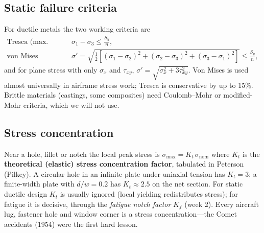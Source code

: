 \documentclass[11pt,a4paper]{article}
\begin{document}
\begin{center}
\end{center}

\subsection{Static failure criteria}

For ductile metals the two working criteria are
\begin{align}
  \text{Tresca (max.\ shear):}\quad & \sigma_1-\sigma_3 \le \frac{S_y}{n},\\
  \text{von Mises (distortion energy):}\quad & \sigma' = \sqrt{\tfrac12\left[(\sigma_1-\sigma_2)^2+(\sigma_2-\sigma_3)^2+(\sigma_3-\sigma_1)^2\right]} \le \frac{S_y}{n},
\end{align}
and for plane stress with only $\sigma_x$ and $\tau_{xy}$, $\sigma'=\sqrt{\sigma_x^2+3\tau_{xy}^2}$. Von Mises is used almost universally in airframe stress work; Tresca is conservative by up to 15\%. Brittle materials (castings, some composites) need Coulomb--Mohr or modified-Mohr criteria, which we will not use.

\subsection{Stress concentration}

Near a hole, fillet or notch the local peak stress is $\sigma_{\max}=K_t\,\sigma_{\text{nom}}$ where $K_t$ is the \textbf{theoretical (elastic) stress concentration factor}, tabulated in Peterson (Pilkey). A circular hole in an infinite plate under uniaxial tension has $K_t=3$; a finite-width plate with $d/w=0.2$ has $K_t\approx 2.5$ on the net section. For static ductile design $K_t$ is usually ignored (local yielding redistributes stress); for fatigue it is decisive, through the \emph{fatigue notch factor} $K_f$ (week 2). Every aircraft lug, fastener hole and window corner is a stress concentration---the Comet accidents (1954) were the first hard lesson.
\end{document}
